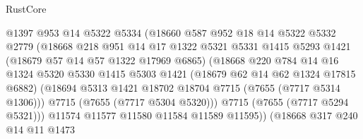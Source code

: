 \begin{lexlean}{RustCore}
\begin{coremodule}
                                @1397
                                @953
                                @14
                                @5322
                                @5334
                                (@18660
                                  @587
                                  @952
                                  @18
                                  @14
                                  @5322
                                  @5332
                                  @2779
                                  (@18668
                                    @218
                                    @951
                                    @14
                                    @17
                                    @1322
                                    @5321
                                    @5331
                                    @1415
                                    @5293
                                    @1421
                                    (@18679 @57 @14 @57 @1322 @17969 @6865)
                                    (@18668
                                      @220
                                      @784
                                      @14
                                      @16
                                      @1324
                                      @5320
                                      @5330
                                      @1415
                                      @5303
                                      @1421
                                      (@18679 @62 @14 @62 @1324 @17815 @6882)
                                      (@18694
                                        @5313
                                        @1421
                                        @18702
                                        @18704
                                        @7715
                                        (@7655 (@7717 @5314 @1306)))
                                      @7715
                                      (@7655 (@7717 @5304 @5320)))
                                    @7715
                                    (@7655 (@7717 @5294 @5321)))
                                  @11574
                                  @11577
                                  @11580
                                  @11584
                                  @11589
                                  @11595))
                              (@18668
                                @317
                                @240
                                @14
                                @11
                                @1473

\end{coremodule}
\end{lexlean}
